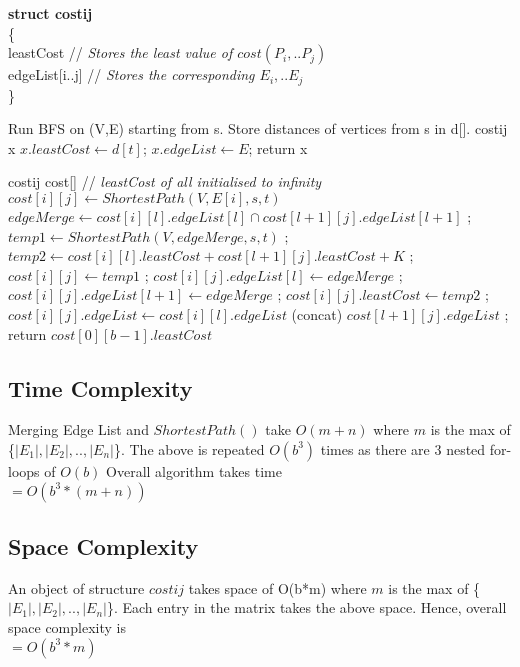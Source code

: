 \documentclass{article}
\begin{document}
{\bf struct costij \\}
\{ \\
\hspace*{1cm} leastCost // \emph{Stores the least value of $cost(P_i,.. P_j)$}\\
\hspace*{1cm} edgeList[i..j] // \emph{Stores the corresponding $E_i, .. E_j$}\\
\}
\vspace*{0.2cm}
\begin{algorithmic}[1]
\State Run BFS on (V,E) starting from s.
\State Store distances of vertices from s in d[].
\State costij x
\State $x.leastCost \gets  d[t]$;
\State $x.edgeList \gets E $;
\State return x
\EndProcedure
\end{algorithmic} 
\vspace*{0.2cm}
\begin{algorithmic}[1]
\State costij cost[] // \emph{leastCost of all initialised to infinity}
\State $cost[i][j] \gets ShortestPath(V,E[i],s,t)$
\Else
{}
\State $edgeMerge \gets cost[i][l].edgeList[l] \cap cost[l+1][j].edgeList[l+1]$ ;
\State $temp1 \gets ShortestPath(V,edgeMerge,s,t)$ ;
\State $temp2 \gets  cost[i][l].leastCost + cost[l+1][j].leastCost + K$ ;
\State $cost[i][j] \gets temp1$ ;
\State $cost[i][j].edgeList[l] \gets edgeMerge$ ;
\State $cost[i][j].edgeList[l+1] \gets edgeMerge$ ;
\Else
\State $cost[i][j].leastCost \gets temp2$ ;
\State $cost[i][j].edgeList \gets cost[i][l].edgeList$ (concat) $cost[l+1][j].edgeList $ ;
\EndIf
\EndFor
\EndIf
\EndFor
\EndFor
\State return $cost[0][b-1].leastCost$
\EndProcedure
\end{algorithmic}

\subsection{Time Complexity}
  Merging Edge List and $ShortestPath()$ take $O(m+n)$ where $m$ is the max of \{$|E_1|, |E_2|,.., |E_n|$\}. 
  The above is repeated $O(b^3)$ times as there are $3$ nested for-loops of $O(b)$
  Overall algorithm takes time \\
             		$ = O(b^3 * (m+n))$
\subsection{Space Complexity}
An object of structure $costij$ takes space of O(b*m) where $m$ is the max of \{$|E_1|, |E_2|,.., |E_n|$\}.
Each entry in the matrix takes the above space. Hence, overall space complexity is \\
					$ = O(b^3 * m)$
\end{document}
